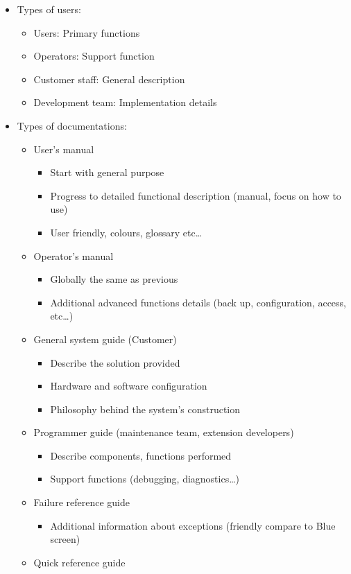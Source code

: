 \begin{itemize}
\item Types of users:

\begin{itemize}
    \item Users: Primary functions
    \item Operators: Support function
    \item Customer staff: General description
    \item Development team: Implementation details
\end{itemize}

\item Types of documentations:

\begin{itemize}
    \item User’s manual
        \begin{itemize}
            \item Start with general purpose
            \item Progress to detailed functional description (manual, focus on how to use)
            \item User friendly, colours, glossary etc\ldots
        \end{itemize}
    \item Operator’s manual
        \begin{itemize}
            \item Globally the same as previous
            \item Additional advanced functions details (back up, configuration, access, etc\ldots)
        \end{itemize}
    \item General system guide (Customer)
        \begin{itemize}
            \item Describe the solution provided
            \item Hardware and software configuration
            \item Philosophy behind the system’s construction
        \end{itemize}
    \item Programmer guide (maintenance team, extension developers)
        \begin{itemize}
            \item Describe components, functions performed
            \item Support functions (debugging, diagnostics\ldots)
        \end{itemize}
    \item Failure reference guide
        \begin{itemize}
            \item Additional information about exceptions (friendly compare to Blue screen)
        \end{itemize}
    \item Quick reference guide
\end{itemize}
\end{itemize}
